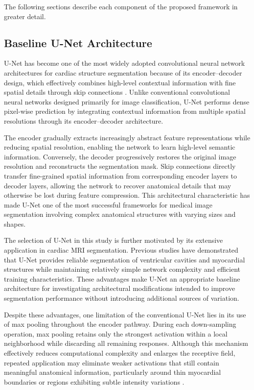 The following sections describe each component of the proposed framework in greater detail.

\subsection{Baseline U-Net Architecture}
\label{subsec:ch4-unet}

U-Net has become one of the most widely adopted convolutional neural network architectures for cardiac structure segmentation because of its encoder--decoder design, which effectively combines high-level contextual information with fine spatial details through skip connections \citep{Ronneberger2015}. Unlike conventional convolutional neural networks designed primarily for image classification, U-Net performs dense pixel-wise prediction by integrating contextual information from multiple spatial resolutions through its encoder--decoder architecture.

The encoder gradually extracts increasingly abstract feature representations while reducing spatial resolution, enabling the network to learn high-level semantic information. Conversely, the decoder progressively restores the original image resolution and reconstructs the segmentation mask. Skip connections directly transfer fine-grained spatial information from corresponding encoder layers to decoder layers, allowing the network to recover anatomical details that may otherwise be lost during feature compression. This architectural characteristic has made U-Net one of the most successful frameworks for medical image segmentation involving complex anatomical structures with varying sizes and shapes.

The selection of U-Net in this study is further motivated by its extensive application in cardiac MRI segmentation. Previous studies have demonstrated that U-Net provides reliable segmentation of ventricular cavities and myocardial structures while maintaining relatively simple network complexity and efficient training characteristics. These advantages make U-Net an appropriate baseline architecture for investigating architectural modifications intended to improve segmentation performance without introducing additional sources of variation.

Despite these advantages, one limitation of the conventional U-Net lies in its use of max pooling throughout the encoder pathway. During each down-sampling operation, max pooling retains only the strongest activation within a local neighborhood while discarding all remaining responses. Although this mechanism effectively reduces computational complexity and enlarges the receptive field, repeated application may eliminate weaker activations that still contain meaningful anatomical information, particularly around thin myocardial boundaries or regions exhibiting subtle intensity variations \citep{Nirthika2022,Diamantis2020}.

